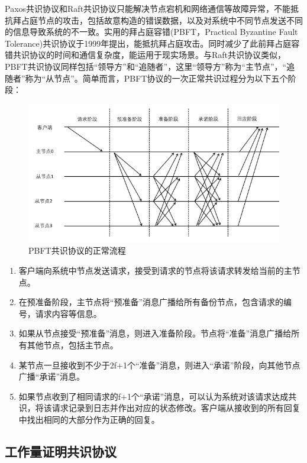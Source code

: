 Paxos共识协议和Raft共识协议只能解决节点宕机和网络通信等故障异常，不能抵抗拜占庭节点的攻击，包括故意构造的错误数据，以及对系统中不同节点发送不同的信息导致系统的不一致。实用的拜占庭容错(PBFT，Practical Byzantine Fault Tolerance)共识协议于1999年提出，能抵抗拜占庭攻击。同时减少了此前拜占庭容错共识协议的时间和通信复杂度，能运用于现实场景。与Raft共识协议类似，PBFT共识协议同样包括“领导方”和“追随者”，这里“领导方”称为“主节点”，“追随者”称为“从节点”。简单而言，PBFT协议的一次正常共识过程分为以下五个阶段：

\begin{figure}
\centering  
\includegraphics [width=400pt]{figures/pbft.png}
\caption{PBFT共识协议的正常流程}
\label{fig:hashchain}
\end{figure}

\begin{enumerate}
  \item 客户端向系统中节点发送请求，接受到请求的节点将该请求转发给当前的主节点。
  \item 在预准备阶段，主节点将“预准备”消息广播给所有备份节点，包含请求的编号，请求内容等信息。
  \item 如果从节点接受“预准备”消息，则进入准备阶段。节点将“准备”消息广播给所有其他节点，包括主节点。
  \item 某节点一旦接收到不少于2f+1个“准备”消息，则进入“承诺”阶段，向其他节点广播“承诺”消息。
  \item 如果节点收到了相同请求的f+1个“承诺”消息，可以认为系统对该请求达成共识，将该请求记录到日志并作出对应的状态修改。客户端从接收到的所有回复中找出相同的大部分作为正确的回复。
\end{enumerate}

\subsection{工作量证明共识协议}
\label{subsec:work-proof}

